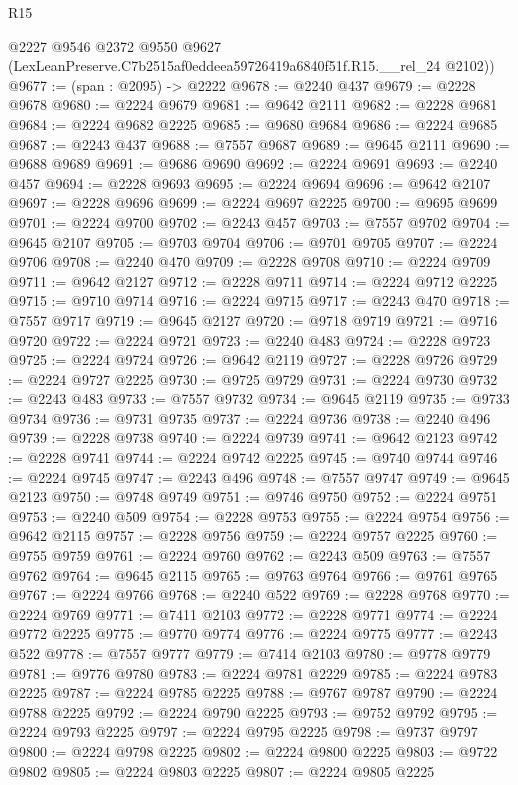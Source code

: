 \begin{lexlean}{R15}
\begin{coremodule}
      @2227
      @9546
      @2372
      @9550
      @9627
      (LexLeanPreserve.C7b2515af0eddeea59726419a6840f51f.R15.__rel_24 @2102))
@9677 := (span : @2095) -> @2222
@9678 := @2240 @437
@9679 := @2228 @9678
@9680 := @2224 @9679
@9681 := @9642 @2111
@9682 := @2228 @9681
@9684 := @2224 @9682 @2225
@9685 := @9680 @9684
@9686 := @2224 @9685
@9687 := @2243 @437
@9688 := @7557 @9687
@9689 := @9645 @2111
@9690 := @9688 @9689
@9691 := @9686 @9690
@9692 := @2224 @9691
@9693 := @2240 @457
@9694 := @2228 @9693
@9695 := @2224 @9694
@9696 := @9642 @2107
@9697 := @2228 @9696
@9699 := @2224 @9697 @2225
@9700 := @9695 @9699
@9701 := @2224 @9700
@9702 := @2243 @457
@9703 := @7557 @9702
@9704 := @9645 @2107
@9705 := @9703 @9704
@9706 := @9701 @9705
@9707 := @2224 @9706
@9708 := @2240 @470
@9709 := @2228 @9708
@9710 := @2224 @9709
@9711 := @9642 @2127
@9712 := @2228 @9711
@9714 := @2224 @9712 @2225
@9715 := @9710 @9714
@9716 := @2224 @9715
@9717 := @2243 @470
@9718 := @7557 @9717
@9719 := @9645 @2127
@9720 := @9718 @9719
@9721 := @9716 @9720
@9722 := @2224 @9721
@9723 := @2240 @483
@9724 := @2228 @9723
@9725 := @2224 @9724
@9726 := @9642 @2119
@9727 := @2228 @9726
@9729 := @2224 @9727 @2225
@9730 := @9725 @9729
@9731 := @2224 @9730
@9732 := @2243 @483
@9733 := @7557 @9732
@9734 := @9645 @2119
@9735 := @9733 @9734
@9736 := @9731 @9735
@9737 := @2224 @9736
@9738 := @2240 @496
@9739 := @2228 @9738
@9740 := @2224 @9739
@9741 := @9642 @2123
@9742 := @2228 @9741
@9744 := @2224 @9742 @2225
@9745 := @9740 @9744
@9746 := @2224 @9745
@9747 := @2243 @496
@9748 := @7557 @9747
@9749 := @9645 @2123
@9750 := @9748 @9749
@9751 := @9746 @9750
@9752 := @2224 @9751
@9753 := @2240 @509
@9754 := @2228 @9753
@9755 := @2224 @9754
@9756 := @9642 @2115
@9757 := @2228 @9756
@9759 := @2224 @9757 @2225
@9760 := @9755 @9759
@9761 := @2224 @9760
@9762 := @2243 @509
@9763 := @7557 @9762
@9764 := @9645 @2115
@9765 := @9763 @9764
@9766 := @9761 @9765
@9767 := @2224 @9766
@9768 := @2240 @522
@9769 := @2228 @9768
@9770 := @2224 @9769
@9771 := @7411 @2103
@9772 := @2228 @9771
@9774 := @2224 @9772 @2225
@9775 := @9770 @9774
@9776 := @2224 @9775
@9777 := @2243 @522
@9778 := @7557 @9777
@9779 := @7414 @2103
@9780 := @9778 @9779
@9781 := @9776 @9780
@9783 := @2224 @9781 @2229
@9785 := @2224 @9783 @2225
@9787 := @2224 @9785 @2225
@9788 := @9767 @9787
@9790 := @2224 @9788 @2225
@9792 := @2224 @9790 @2225
@9793 := @9752 @9792
@9795 := @2224 @9793 @2225
@9797 := @2224 @9795 @2225
@9798 := @9737 @9797
@9800 := @2224 @9798 @2225
@9802 := @2224 @9800 @2225
@9803 := @9722 @9802
@9805 := @2224 @9803 @2225
@9807 := @2224 @9805 @2225

\end{coremodule}
\end{lexlean}
